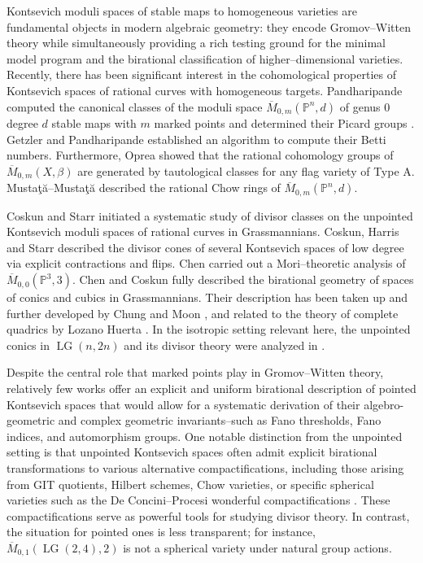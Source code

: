 \documentclass[10pt]{amsart}
\theoremstyle{definition}
\newcommand{\Mbar}{\overline{M}}
\newcommand{\LG}{\operatorname{LG}}
\theoremstyle{plain} %
\begin{document}
Kontsevich moduli spaces of stable maps to homogeneous varieties are fundamental  objects in modern algebraic geometry: they encode Gromov--Witten theory while simultaneously providing a rich testing ground for the minimal model program and the birational classification of higher--dimensional varieties.
Recently, there has been significant interest in the cohomological properties of Kontsevich spaces of rational curves with homogeneous targets. Pandharipande \cite{P97} computed the canonical classes of the moduli space
$\Mbar_{0,m}(\mathbb P^n,d)$ of genus $0$ degree $d$ stable maps with $m$ marked points and determined their Picard groups \cite{P99}. Getzler and Pandharipande \cite{GP} established an algorithm to compute their Betti numbers. Furthermore, Oprea \cite{OP06} showed that the rational cohomology groups of $\Mbar_{0,m}(X,\beta)$ are generated by tautological classes for any flag variety of Type A. Musta\c{t}\u{a}--Musta\c{t}\u{a} 
\cite{MM07,MM08,MM10} described the rational Chow rings of $\Mbar_{0,m}(\mathbb P^n,d)$.
 
 


Coskun and Starr \cite{CS06} initiated a systematic study of divisor classes on the unpointed Kontsevich moduli spaces of rational curves in Grassmannians. Coskun, Harris and Starr \cite{CHS08,CHS09} described the divisor cones of several Kontsevich spaces of low degree via explicit contractions and flips. Chen \cite{Ch08} carried out a Mori--theoretic analysis of
$\Mbar_{0,0}(\mathbb P^3,3)$.  Chen and Coskun \cite{CC10} fully described the birational geometry of spaces of conics and cubics in Grassmannians. Their description has been taken up and further developed by Chung and Moon \cite{CM17}, and related to the theory of complete quadrics by Lozano Huerta \cite{LoH}. In the isotropic setting relevant here, the unpointed conics in $\LG(n,2n)$ and its divisor theory were analyzed in \cite{CM}.

Despite the central role that marked points play in Gromov--Witten theory, relatively few works offer an explicit and uniform birational description of pointed Kontsevich spaces that would allow for a systematic derivation of their algebro-geometric and complex geometric invariants--such as Fano thresholds, Fano indices, and automorphism groups. 
One notable distinction from the unpointed setting is that unpointed Kontsevich spaces often admit explicit birational transformations to various alternative compactifications, including those arising from GIT quotients, Hilbert schemes, Chow varieties, or specific spherical varieties such as the De Concini--Procesi wonderful compactifications \cite{KM10,CC10,CC11,LoH,CM17,CM,CCM}. These compactifications serve as powerful tools for studying divisor theory. In contrast, the situation for pointed ones is less transparent; for instance, $\overline{M}_{0,1}(\LG(2,4),2)$ is not a spherical variety under natural group actions.
\end{document}
